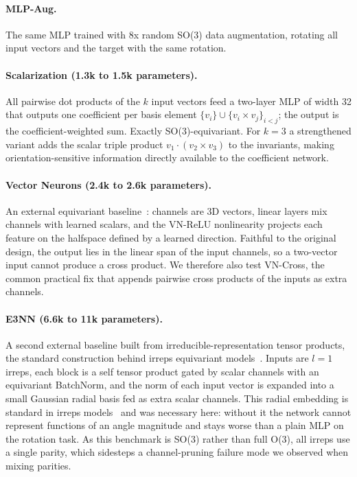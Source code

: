 \documentclass[11pt]{article}
\begin{document}
\paragraph{MLP-Aug.} The same MLP trained with 8x random SO(3) data
augmentation, rotating all input vectors and the target with the same
rotation.

\paragraph{Scalarization (1.3k to 1.5k parameters).} All pairwise dot products
of the $k$ input vectors feed a two-layer MLP of width 32 that outputs one
coefficient per basis element $\{v_i\} \cup \{v_i \times v_j\}_{i<j}$; the
output is the coefficient-weighted sum. Exactly SO(3)-equivariant. For $k=3$
a strengthened variant adds the scalar triple product
$v_1 \cdot (v_2 \times v_3)$ to the invariants, making orientation-sensitive
information directly available to the coefficient network.

\paragraph{Vector Neurons (2.4k to 2.6k parameters).} An external equivariant
baseline~\citep{deng2021vector}: channels are 3D vectors, linear layers mix
channels with learned scalars, and the VN-ReLU nonlinearity projects each
feature on the halfspace defined by a learned direction. Faithful to the
original design, the output lies in the linear span of the input channels,
so a two-vector input cannot produce a cross product. We therefore also test
VN-Cross, the common practical fix that appends pairwise cross products of
the inputs as extra channels.

\paragraph{E3NN (6.6k to 11k parameters).} A second external baseline built
from irreducible-representation tensor products, the standard construction
behind irreps equivariant models~\citep{thomas2018tensor,geiger2022e3nn}.
Inputs are $l{=}1$ irreps, each block is a self tensor product gated by scalar
channels with an equivariant BatchNorm, and the norm of each input vector is
expanded into a small Gaussian radial basis fed as extra scalar channels. This
radial embedding is standard in irreps models~\citep{batzner2022nequip} and
was necessary here: without it the network cannot represent functions of an
angle magnitude and stays worse than a plain MLP on the rotation task. As this
benchmark is SO(3) rather than full O(3), all irreps use a single parity, which
sidesteps a channel-pruning failure mode we observed when mixing parities.
\end{document}
